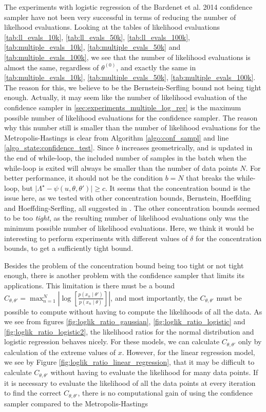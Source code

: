 The experiments with logistic regression of the Bardenet et al. 2014 confidence sampler have not been very successful in terms of reducing the number of likelhood evaluations. Looking at the tables of likelihood evaluations \ref{tab:ll_evals_10k}, \ref{tab:ll_evals_50k}, \ref{tab:ll_evals_100k}, \ref{tab:multiple_evals_10k}, \ref{tab:multiple_evals_50k} and  \ref{tab:multiple_evals_100k}, we see that the number of likelihood evaluations is almost the same, regardless of $\theta^{\left(0\right)}$, and exactly the same in \ref{tab:multiple_evals_10k}, \ref{tab:multiple_evals_50k}, \ref{tab:multiple_evals_100k}. The reason for this, we believe to be the Bernstein-Serfling bound not being tight enough. Actually, it may seem like the number of likelihood evaluation of the confidence sampler in \ref{sec:experiments_multiple_log_reg} is the maximum possible number of likelihood evaluations for the confidence sampler. The reason why this number still is smaller than the number of likelihood evaluations for the Metropolis-Hastings is clear from Algorithm \ref{algo:conf_sampl} and line \ref{algo_state:confidence_test}. Since $b$ increases geometrically, and is updated in the end of while-loop, the included number of samples in the batch when the while-loop is exited will always be smaller than the number of data points $N$. For better performance, it should not be the condition $b = N$ that breaks the while-loop, but $\mid \Lambda
^{\star}- \psi\left(u, \theta, \theta'\right)\mid \geq c$. It seems that the concentration bound is the issue here, as we tested with other concentration bounds, Bernstein, Hoeffding and Hoeffding-Serfling, all suggested in \cite{bardenet2015concentration}. The other concentration bounds seemed to be too \textit{tight}, as the resulting number of likelihood evaluations only was the minimum possible number of likelihood evaluations. Here, we think it would be interesting to perform experiments with different values of $\delta$ for the concentration bounds, to get a sufficiently tight bound. 

Besides the problem of the concentration bound being too tight or not tight enough, there is another problem with the confidence sampler that limits its applications.
This limitation is there must be a bound $C_{\theta, \theta'} =  \max_{n=1}^N\left| \log\left[\frac{p\left(x_n\mid \theta'\right)}{p\left(x_n\mid \theta\right)}\right]\right|$,
and most importantly, the $C_{\theta, \theta'}$ must be possible to compute without having to compute the likelihoods of all the data. As we see from figures \ref{fig:loglik_ratio_gaussian}, \ref{fig:loglik_ratio_logistic} and \ref{fig:loglik_ratio_logistic2}, the likelihood ratios for the normal distribution and logistic regression behaves nicely. For these models, we can calculate $C_{\theta, \theta'}$ only by calculation of the extreme values of $x$. However, for the linear regression model, we see by Figure \ref{fig:loglik_ratio_linear_regression}, that it may be difficult to calculate $C_{\theta, \theta'}$ without having to evaluate the likelihood for many data points. If it is necessary to evaluate the likelihood of all the data points at every iteration to find the correct $C_{\theta, \theta'}$, there is no computational gain of using the confidence sampler compared to the Metropolis-Hastings 

